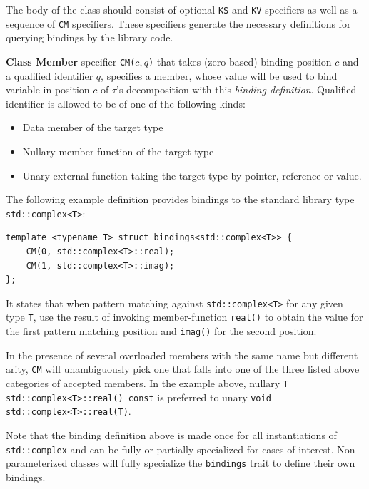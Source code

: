 \documentclass[preprint]{sigplanconf}
\makeatletter
\DeclareRobustCommand{\code}[1]{{\lstinline[breaklines=false,escapechar=@]{#1}}}
\makeatother
\begin{document}
\noindent
The body of the class should consist of optional \code{KS} and \code{KV} 
specifiers as well as a sequence of \code{CM} specifiers. These specifiers 
generate the necessary definitions for querying bindings by the library code.

{\bf Class Member} specifier \code{CM(}$c,q$\code{)} that takes (zero-based) binding 
position $c$ and a qualified identifier $q$, specifies a member, whose value will 
be used to bind variable in position $c$ of $\tau$'s decomposition with this 
\emph{binding definition}. Qualified identifier is allowed to be of one of the 
following kinds:

\begin{itemize}
\setlength{\itemsep}{0pt}
\setlength{\parskip}{0pt}
\item Data member of the target type
\item Nullary member-function of the target type
\item Unary external function taking the target type by pointer, reference or value.
\end{itemize}

\noindent
The following example definition provides bindings to the standard library type 
\code{std::complex<T>}:

\begin{lstlisting}[keepspaces,columns=flexible]
template <typename T> struct bindings<std::complex<T>> {
    CM(0, std::complex<T>::real); 
    CM(1, std::complex<T>::imag); 
};
\end{lstlisting}

\noindent
It states that when pattern matching against \code{std::complex<T>} for any 
given type \code{T}, use the result of invoking member-function \code{real()} to 
obtain the value for the first pattern matching position and \code{imag()} for 
the second position. 

In the presence of several overloaded members with the same name but different 
arity, \code{CM} will unambiguously pick one that falls into one of the three 
listed above categories of accepted members. In the example above, nullary 
\code{T std::complex<T>::real() const} is preferred to unary 
\code{void std::complex<T>::real(T)}.

Note that the binding definition above is made once for all instantiations of 
\code{std::complex} and can be fully or partially specialized for cases of 
interest. Non-parameterized classes will fully specialize the \code{bindings} 
trait to define their own bindings.
\end{document}
